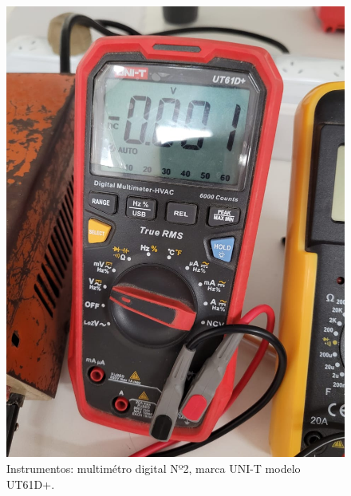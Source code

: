 \documentclass[chaptersright]{informeutn}
\begin{document}
    \begin{figure}[H]
        \centering
        \begin{minipage}{0.3\textwidth}
            \centering
            \includegraphics[width=\textwidth]{pictures/multimetro-gaston.jpeg}
            \caption{Instrumentos: multimétro digital Nº2, marca UNI-T modelo UT61D+.}
        \end{minipage}
        \hspace{0.05\textwidth} %
        \begin{minipage}{0.3\textwidth}
            \centering

\end{minipage}
\end{figure}
\end{document}
